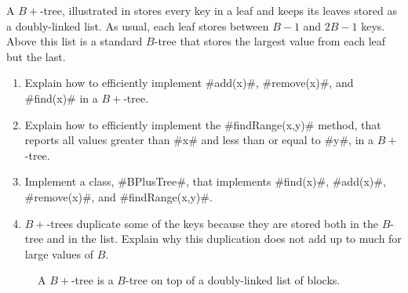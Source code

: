 \begin{exc}
  A $B+$-tree, illustrated in  stores every key in a
  leaf and keeps its leaves stored as a doubly-linked list.  As usual,
  each leaf stores between $B-1$ and $2B-1$ keys.  Above this list is
  a standard $B$-tree that stores the largest value from each leaf but
  the last.
  \begin{enumerate}
    \item Explain how to efficiently implement #add(x)#, #remove(x)#,
      and #find(x)# in a $B+$-tree.
    \item Explain how to efficiently implement the #findRange(x,y)# method,
      that reports all values
      greater than #x# and less than or equal to #y#, in
      a $B+$-tree.
    \item Implement a class, #BPlusTree#, that implements #find(x)#,
      #add(x)#, #remove(x)#, and #findRange(x,y)#.
    \item $B+$-trees duplicate some of the keys because they are stored
      both in the $B$-tree and in the list.  Explain why this duplication
      does not add up to much for large values of $B$.
  \end{enumerate}
\end{exc}

\begin{figure}
  \caption{A $B+$-tree is a $B$-tree on top of a doubly-linked list of blocks.}
\end{figure}


